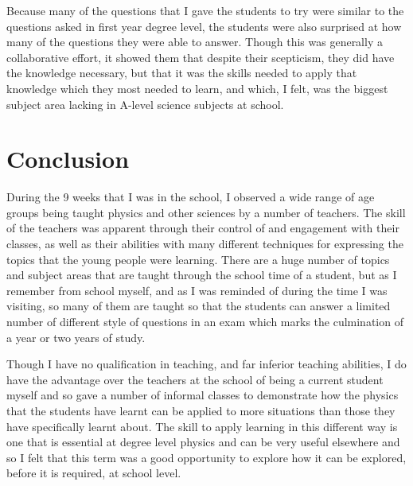         Because many of the questions that I gave the students to try were similar to the questions asked in first year degree level, the students were also surprised at how many of the questions they were able to answer. Though this was generally a collaborative effort, it showed them that despite their scepticism, they did have the knowledge necessary, but that it was the skills needed to apply that knowledge which they most needed to learn, and which, I felt, was the biggest subject area lacking in A-level science subjects at school.
\section{Conclusion} %
\label{sec:Conclusion}
    During the 9 weeks that I was in the school, I observed a wide range of age groups being taught physics and other sciences by a number of teachers. The skill of the teachers was apparent through their control of and engagement with their classes, as well as their abilities with many different techniques for expressing the topics that the young people were learning. There are a huge number of topics and subject areas that are taught through the school time of a student, but as I remember from school myself, and as I was reminded of during the time I was visiting, so many of them are taught so that the students can answer a limited number of different style of questions in an exam which marks the culmination of a year or two years of study.

    Though I have no qualification in teaching, and far inferior teaching abilities, I do have the advantage over the teachers at the school of being a current student myself and so gave a number of informal classes to demonstrate how the physics that the students have learnt can be applied to more situations than those they have specifically learnt about. The skill to apply learning in this different way is one that is essential at degree level physics and can be very useful elsewhere and so I felt that this term was a good opportunity to explore how it can be explored, before it is required, at school level. 
